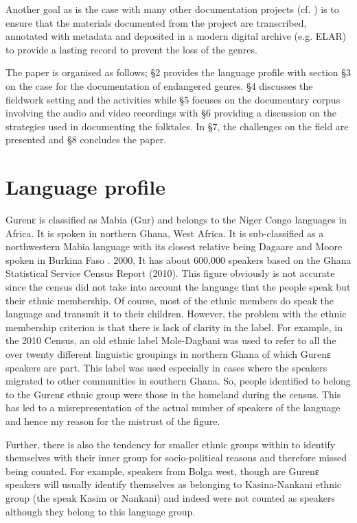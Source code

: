 \documentclass[output=paper,colorlinks,citecolor=brown]{langscibook}
\begin{document}
Another goal as is the case with many other documentation projects (cf. \citealt{TrilsbeekWittenburg2006, Austin2003, Austin2006, Himmelmann1998, HimmelmannEtAl2006}) is to ensure that the materials documented from the project are transcribed, annotated with metadata and deposited in a modern digital archive (e.g. ELAR) to provide a lasting record to prevent the loss of the genres. 

The paper is organised as follows; §2 provides the language profile with section §3 on the case for the documentation of endangered genres. §4 discusses the fieldwork setting and the activities while §5 focuses on the documentary corpus involving the audio and video recordings with §6 providing a discussion on the strategies used in documenting the folktales. In §7, the challenges on the field are presented and §8 concludes the paper. 

\section{Language profile}
Gurenɛ is classified as Mabia (Gur) and belongs to the Niger Congo languages in Africa. It is spoken in northern Ghana, West Africa. It is sub-classified as a northwestern Mabia language with its closest relative being Dagaare and Moore spoken in Burkina Faso \citep{Naden1989, Bendor-SamuelHartell1989, Bodomo1994, Bodomo2004, Bodomo2020}.  2000,  It has about 600,000 speakers based on the Ghana Statistical Service Census Report (2010). This figure obviously is not accurate since the census did not take into account the language that the people speak but their ethnic membership. Of course, most of the ethnic members do speak the language and transmit it to their children. However, the problem with the ethnic membership criterion is that there is lack of clarity in the label. For example, in the 2010 Census, an old ethnic label Mole-Dagbani was used to refer to all the over twenty different linguistic groupings in northern Ghana of which Gurenɛ speakers are part. This label was used especially in cases where the speakers migrated to other communities in southern Ghana. So, people identified to belong to the Gurenɛ ethnic group were those in the homeland during the census. This has led to a misrepresentation of the actual number of speakers of the language and hence my reason for the mistrust of the figure.

Further, there is also the tendency for smaller ethnic groups within to identify themselves with their inner group for socio-political reasons and therefore missed being counted. For example, speakers from Bolga west, though are Gurenɛ speakers will usually identify themselves as belonging to Kasina-Nankani ethnic group (the speak Kasim or Nankani) and indeed were not counted as speakers although they belong to this language group. 
\end{document}
